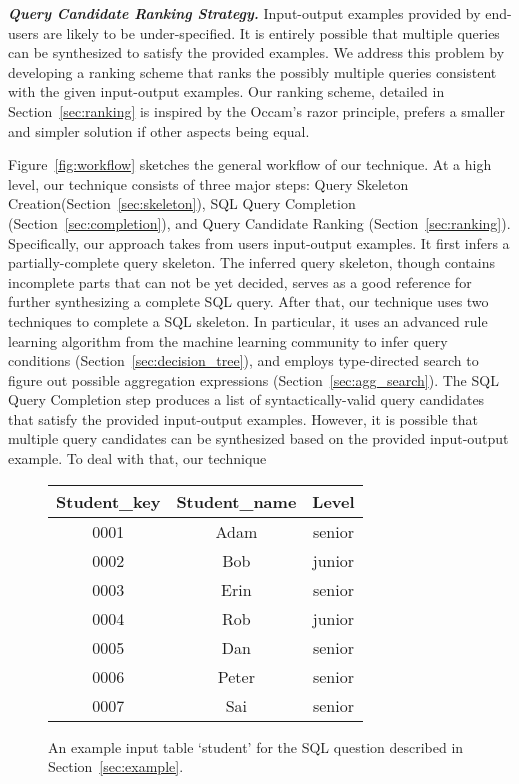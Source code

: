\vspace{1mm}
\noindent \textbf{\textit{Query Candidate Ranking Strategy.}}
Input-output examples provided by end-users are likely to
be under-specified. It is entirely possible that multiple
queries can be synthesized to satisfy the provided examples.
We address this problem by developing a ranking scheme that 
ranks the possibly multiple queries
consistent with the given input-output
examples. Our ranking scheme, detailed in Section~\ref{sec:ranking}
is inspired by the Occam's razor principle, prefers a smaller and
simpler solution if other aspects being equal.



Figure~\ref{fig:workflow} sketches the general workflow of our technique.
At a high level, our technique consists of three major steps: Query Skeleton
Creation(Section~\ref{sec:skeleton}), SQL Query Completion
(Section~\ref{sec:completion}), and Query Candidate Ranking (Section~\ref{sec:ranking}).
Specifically, our approach takes from users input-output examples. It first infers
a partially-complete query skeleton. The inferred query skeleton, though contains
incomplete parts that can not be yet decided, serves as a good reference
for further synthesizing a complete SQL query.
After that, our technique uses two techniques to complete a SQL skeleton.
In particular, it uses an advanced rule learning algorithm from the machine
learning community to infer query conditions (Section~\ref{sec:decision_tree}), and
 employs type-directed search to figure out possible aggregation
expressions (Section~\ref{sec:agg_search}).
The SQL Query Completion step produces a list of syntactically-valid
query candidates that satisfy the provided input-output examples.
However, it is possible that multiple query candidates can be synthesized based on the
provided input-output example. To deal with that, our technique



\begin{figure}[t]
	\centering
\begin{tabular}{|c|c|c|}
\hline
 Student\_key& Student\_name & Level\\
\hline
 0001 & Adam & senior \\
 \hline
 0002 & Bob & junior \\
 \hline
 0003 & Erin & senior \\
 \hline
 0004 & Rob & junior\\
 \hline
 0005 & Dan & senior \\
 \hline
 0006 & Peter & senior \\
 \hline
 0007 & Sai & senior \\
 \hline
\end{tabular}
	\caption{An example input table `student'
for the SQL question described in
Section~\ref{sec:example}.}
	\label{tbl:student}
\end{figure}


